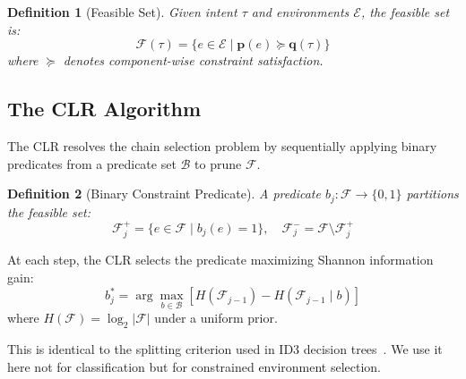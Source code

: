 \documentclass[conference, 10pt, twocolumn]{IEEEtran}
\newtheorem{definition}{Definition}
\begin{document}
\begin{definition}[Feasible Set]
Given intent $\tau$ and environments $\mathcal{E}$, the
\emph{feasible set} is:
\begin{equation}
\mathcal{F}(\tau) = \{ e \in \mathcal{E} \mid \mathbf{p}(e) \succeq
\mathbf{q}(\tau) \}
\end{equation}
where $\succeq$ denotes component-wise constraint satisfaction.
\end{definition}

\subsection{The CLR Algorithm}

The CLR resolves the chain selection problem by sequentially applying
binary predicates from a predicate set $\mathcal{B}$ to prune
$\mathcal{F}$.

\begin{definition}[Binary Constraint Predicate]
A predicate $b_j : \mathcal{F} \to \{0, 1\}$ partitions the feasible
set:
\begin{equation}
\mathcal{F}^{+}_j = \{ e \in \mathcal{F} \mid b_j(e) = 1 \}, \quad
\mathcal{F}^{-}_j = \mathcal{F} \setminus \mathcal{F}^{+}_j
\end{equation}
\end{definition}

At each step, the CLR selects the predicate maximizing Shannon
information gain:
\begin{equation}
b_j^* = \arg\max_{b \in \mathcal{B}} \left[ H(\mathcal{F}_{j-1}) -
H(\mathcal{F}_{j-1} \mid b) \right]
\label{eq:max_info_gain}
\end{equation}
where $H(\mathcal{F}) = \log_2 |\mathcal{F}|$ under a uniform prior.

This is identical to the splitting criterion used in ID3 decision
trees~\cite{quinlan1986induction}.  We use it here not for
classification but for constrained environment selection.
\end{document}

